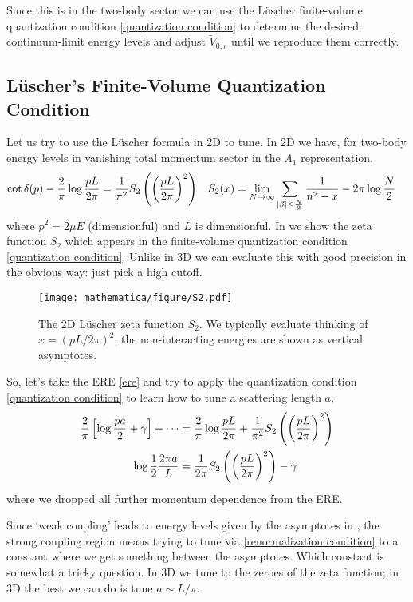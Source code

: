 Since this is in the two-body sector we can use the L\"{u}scher finite-volume quantization condition \eqref{quantization condition} to determine the desired continuum-limit energy levels and adjust $\tilde{V}_{0,r}$ until we reproduce them correctly.

\subsection{L\"{u}scher's Finite-Volume Quantization Condition}

Let us try to use the L\"{u}scher formula in 2D \cite{Zhu:2019dho,Korber:2019cuq} to tune.
In 2D we have, for two-body energy levels in vanishing total momentum sector in the $A_1$ representation,
\begin{align}
	\cot \delta(p) - \frac{2}{\pi} \log \frac{pL}{2\pi} &= \frac{1}{\pi^2} S_2\left(\left(\frac{pL}{2\pi}\right)^2\right)
	&	
	S_2(x) &= \lim_{N\rightarrow\infty} \sum_{\left| \vec{n} \right| \leq \frac{N}{2}} \frac{1}{n^2-x} - 2\pi \log \frac{N}{2}
	\label{eq:quantization condition}
\end{align}
where $p^2=2\mu E$ (dimensionful) and $L$ is dimensionful.
In  we show the zeta function $S_2$ which appears in the finite-volume quantization condition \eqref{quantization condition}.
Unlike in 3D we can evaluate this with good precision in the obvious way: just pick a high cutoff.
\begin{figure}
	\texttt{[image: mathematica/figure/S2.pdf]}
	\caption{The 2D L\"{u}scher zeta function $S_2$.  We typically evaluate thinking of $x = (pL/2\pi)^2$; the non-interacting energies are shown as vertical asymptotes.}
	\label{fig:S2}
\end{figure}

So, let's take the ERE \eqref{ere} and try to apply the quantization condition \eqref{quantization condition} to learn how to tune a scattering length $a$,
\begin{align}
	\frac{2}{\pi} \left[\log\frac{pa}{2} + \gamma \right] + \cdots
	&=
	\frac{2}{\pi} \log \frac{pL}{2\pi} + \frac{1}{\pi^2} S_2\left(\left(\frac{pL}{2\pi}\right)^2\right)
	\\
	\log \frac{1}{2} \frac{2\pi a}{L} &= \frac{1}{2\pi} S_2\left(\left(\frac{pL}{2\pi}\right)^2\right) - \gamma
	\label{eq:renormalization condition}
\end{align}
where we dropped all further momentum dependence from the ERE.

Since `weak coupling' leads to energy levels given by the asymptotes in , the strong coupling region means trying to tune via \eqref{renormalization condition} to a constant where we get something between the asymptotes.
Which constant is somewhat a tricky question.
In 3D we tune to the zeroes of the zeta function; in 3D the best we can do is tune $a \sim L/\pi$.

